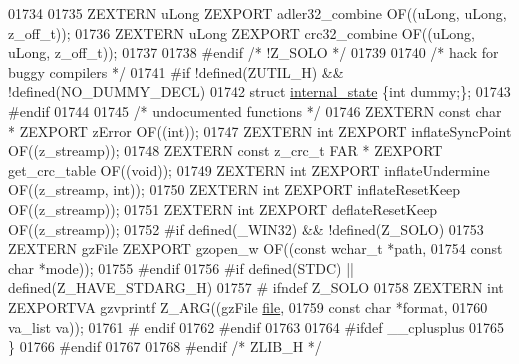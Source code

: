 \begin{DoxyCode}
01734 
01735    ZEXTERN uLong ZEXPORT adler32\_combine OF((uLong, uLong, z\_off\_t));
01736    ZEXTERN uLong ZEXPORT crc32\_combine OF((uLong, uLong, z\_off\_t));
01737 
01738 \textcolor{preprocessor}{#endif }\textcolor{comment}{/* !Z\_SOLO */}\textcolor{preprocessor}{}
01739 
01740 \textcolor{comment}{/* hack for buggy compilers */}
01741 \textcolor{preprocessor}{#if !defined(ZUTIL\_H) && !defined(NO\_DUMMY\_DECL)}
01742     \textcolor{keyword}{struct }\hyperlink{structinternal__state}{internal\_state} \{\textcolor{keywordtype}{int} dummy;\};
01743 \textcolor{preprocessor}{#endif}
01744 
01745 \textcolor{comment}{/* undocumented functions */}
01746 ZEXTERN \textcolor{keyword}{const} \textcolor{keywordtype}{char}   * ZEXPORT zError           OF((\textcolor{keywordtype}{int}));
01747 ZEXTERN \textcolor{keywordtype}{int}            ZEXPORT inflateSyncPoint OF((z\_streamp));
01748 ZEXTERN \textcolor{keyword}{const} z\_crc\_t FAR * ZEXPORT get\_crc\_table    OF((\textcolor{keywordtype}{void}));
01749 ZEXTERN \textcolor{keywordtype}{int}            ZEXPORT inflateUndermine OF((z\_streamp, \textcolor{keywordtype}{int}));
01750 ZEXTERN \textcolor{keywordtype}{int}            ZEXPORT inflateResetKeep OF((z\_streamp));
01751 ZEXTERN \textcolor{keywordtype}{int}            ZEXPORT deflateResetKeep OF((z\_streamp));
01752 \textcolor{preprocessor}{#if defined(\_WIN32) && !defined(Z\_SOLO)}
01753 ZEXTERN gzFile         ZEXPORT gzopen\_w OF((\textcolor{keyword}{const} \textcolor{keywordtype}{wchar\_t} *path,
01754                                             \textcolor{keyword}{const} \textcolor{keywordtype}{char} *mode));
01755 \textcolor{preprocessor}{#endif}
01756 \textcolor{preprocessor}{#if defined(STDC) || defined(Z\_HAVE\_STDARG\_H)}
01757 \textcolor{preprocessor}{#  ifndef Z\_SOLO}
01758 ZEXTERN \textcolor{keywordtype}{int}            ZEXPORTVA gzvprintf Z\_ARG((gzFile \hyperlink{structfile}{file},
01759                                                   \textcolor{keyword}{const} \textcolor{keywordtype}{char} *format,
01760                                                   va\_list va));
01761 \textcolor{preprocessor}{#  endif}
01762 \textcolor{preprocessor}{#endif}
01763 
01764 \textcolor{preprocessor}{#ifdef \_\_cplusplus}
01765 \}
01766 \textcolor{preprocessor}{#endif}
01767 
01768 \textcolor{preprocessor}{#endif }\textcolor{comment}{/* ZLIB\_H */}\textcolor{preprocessor}{}
\end{DoxyCode}
